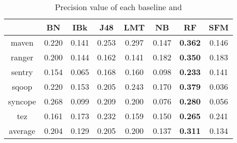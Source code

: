 

\begin{table}[!ht]
\caption{Precision value of each baseline and \simfinmo}
\centering
\begin{tabular}{|c|c|c|c|c|c|c|c|}
\hline
& BN & IBk & J48 & LMT & NB & RF & SFM \\ \hline
maven & 0.220 & 0.141 & 0.253 & 0.297 & 0.147 & \textbf{0.362} & 0.146 \\ \hline
ranger & 0.200 & 0.144 & 0.162 & 0.141 & 0.182 & \textbf{0.350} & 0.183 \\ \hline
sentry & 0.154 & 0.065 & 0.168 & 0.160 & 0.098 & \textbf{0.233} & 0.141 \\ \hline
sqoop & 0.220 & 0.153 & 0.205 & 0.243 & 0.170 & \textbf{0.379} & 0.036 \\ \hline
syncope & 0.268 & 0.099 & 0.209 & 0.200 & 0.076 & \textbf{0.280} & 0.056 \\ \hline
tez & 0.161 & 0.173 & 0.232 & 0.159 & 0.150 & \textbf{0.265} & 0.241 \\ \hline
average & 0.204 & 0.129 & 0.205 & 0.200 & 0.137 & \textbf{0.311} & 0.134 \\ \hline
\end{tabular}%

\label{tab:precision}
\end{table}

